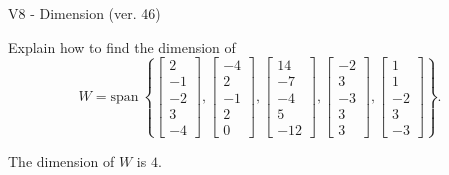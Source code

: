 \begin{exercise}
  \begin{exerciseTitle}V8 - Dimension (ver. 46)\end{exerciseTitle}
  \begin{exerciseStatement}
    Explain how to find the dimension of 
\[W=\mathrm{span}\ \left\{\left[\begin{array}{r}
2 \\
-1 \\
-2 \\
3 \\
-4
\end{array}\right] , \left[\begin{array}{r}
-4 \\
2 \\
-1 \\
2 \\
0
\end{array}\right] , \left[\begin{array}{r}
14 \\
-7 \\
-4 \\
5 \\
-12
\end{array}\right] , \left[\begin{array}{r}
-2 \\
3 \\
-3 \\
3 \\
3
\end{array}\right] , \left[\begin{array}{r}
1 \\
1 \\
-2 \\
3 \\
-3
\end{array}\right]\right\}.\]



  \end{exerciseStatement}
  \begin{exerciseAnswer}
   The dimension of \(W\) is  \(4\).
  


  \end{exerciseAnswer}
\end{exercise}